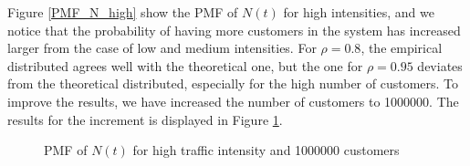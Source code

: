 \documentclass[12pt, a4paper]{article}
\begin{document}
Figure \ref{PMF_N_high} show the PMF of $N(t)$ for high intensities, and we notice that the 
probability of having more customers in the system has increased larger from the case of low 
and medium intensities. For $\rho=0.8$, the empirical distributed agrees well with the theoretical
one, but the one for $\rho=0.95$ deviates from the theoretical distributed, especially for the high 
number of customers. To improve the results, we have increased the number of customers to 1000000.
The results for the increment is displayed in Figure \ref{PMF_N_high_more_cust}.

\begin{figure}[H]
  \centering
  \hspace{0px}
  \caption{PMF of $N(t)$  for high traffic intensity and 1000000 customers}  
  \label{PMF_N_high_more_cust}
\end{figure}
\end{document}
